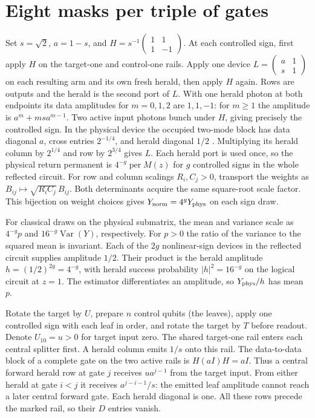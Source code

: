 \documentclass[11pt]{article}
\DeclareMathOperator{\per}{per}
\DeclareMathOperator{\Var}{Var}
\begin{document}
\section{Eight masks per triple of gates}
Set \(s=\sqrt2\), \(a=1-s\), and \(H=s^{-1}\left(\begin{smallmatrix}1&1\\1&-1\end{smallmatrix}\right)\). At each controlled sign, first apply \(H\) on the target-one and control-one rails. Apply one device \(L=\left(\begin{smallmatrix}a&1\\s&1\end{smallmatrix}\right)\) on each resulting arm and its own fresh herald, then apply \(H\) again. Rows are outputs and the herald is the second port of \(L\). With one herald photon at both endpoints its data amplitudes for \(m=0,1,2\) are \(1,1,-1\): for \(m\ge1\) the amplitude is \(a^m+ms a^{m-1}\). Two active input photons bunch under \(H\), giving precisely the controlled sign. In the physical device the occupied two-mode block has data diagonal \(a\), cross entries \(2^{-1/4}\), and herald diagonal \(1/2\) \cite{aaronson}. Multiplying its herald column by \(2^{1/4}\) and row by \(2^{3/4}\) gives \(L\). Each herald port is used once, so the physical return permanent is \(4^{-g}\per M(z)\) for \(g\) controlled signs in the whole reflected circuit. For row and column scalings \(R_i,C_j>0\), transport the weights as \(B_{ij}\mapsto\sqrt{R_i C_j}\,B_{ij}\). Both determinants acquire the same square-root scale factor. This bijection on weight choices gives \(Y_{\rm norm}=4^gY_{\rm phys}\) on each sign draw.

For classical draws on the physical submatrix, the mean and variance scale as \(4^{-g}p\) and \(16^{-g}\Var(Y)\), respectively. For \(p>0\) the ratio of the variance to the squared mean is invariant. Each of the \(2g\) nonlinear-sign devices in the reflected circuit supplies amplitude \(1/2\). Their product is the herald amplitude \(h=(1/2)^{2g}=4^{-g}\), with herald success probability \(|h|^2=16^{-g}\) on the logical circuit at \(z=1\). The estimator differentiates an amplitude, so \(Y_{\rm phys}/h\) has mean \(p\).

Rotate the target by \(U\), prepare \(n\) control qubits (the leaves), apply one controlled sign with each leaf in order, and rotate the target by \(T\) before readout. Denote \(U_{10}=u>0\) for target input zero. The shared target-one rail enters each central splitter first. A herald column emits \(1/s\) onto this rail. The data-to-data block of a complete gate on the two active rails is \(H(aI)H=aI\). Thus a central forward herald row at gate \(j\) receives \(u a^{j-1}\) from the target input. From either herald at gate \(i<j\) it receives \(a^{j-i-1}/s\): the emitted leaf amplitude cannot reach a later central forward gate. Each herald diagonal is one. All these rows precede the marked rail, so their \(D\) entries vanish.
\end{document}
